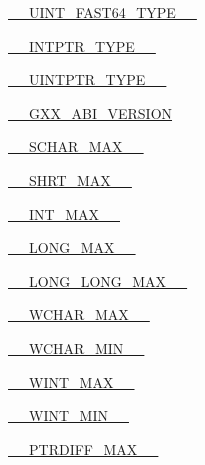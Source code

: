 \begin{DoxyCompactItemize}
\item 
\hyperlink{cmake-build-release_2CMakeCache_8txt_aa588b63d52e2735c82b0262ae2034b2e}{\+\_\+\+\_\+\+U\+I\+N\+T\+\_\+\+F\+A\+S\+T64\+\_\+\+T\+Y\+P\+E\+\_\+\+\_\+}
\item 
\hyperlink{cmake-build-release_2CMakeCache_8txt_ac93efd8e9d485881d53ab451f844c8ec}{\+\_\+\+\_\+\+I\+N\+T\+P\+T\+R\+\_\+\+T\+Y\+P\+E\+\_\+\+\_\+}
\item 
\hyperlink{cmake-build-release_2CMakeCache_8txt_a835a336a71d176cb81526e3e2acf8343}{\+\_\+\+\_\+\+U\+I\+N\+T\+P\+T\+R\+\_\+\+T\+Y\+P\+E\+\_\+\+\_\+}
\item 
\hyperlink{cmake-build-release_2CMakeCache_8txt_af2a3b27e09cc851abc4ef3e7daea66c2}{\+\_\+\+\_\+\+G\+X\+X\+\_\+\+A\+B\+I\+\_\+\+V\+E\+R\+S\+I\+ON}
\item 
\hyperlink{cmake-build-release_2CMakeCache_8txt_ad1e3a625f5463100aab8db5fedf63d52}{\+\_\+\+\_\+\+S\+C\+H\+A\+R\+\_\+\+M\+A\+X\+\_\+\+\_\+}
\item 
\hyperlink{cmake-build-release_2CMakeCache_8txt_aaa2dae7d1963575bc4e3e95e3fee9ed4}{\+\_\+\+\_\+\+S\+H\+R\+T\+\_\+\+M\+A\+X\+\_\+\+\_\+}
\item 
\hyperlink{cmake-build-release_2CMakeCache_8txt_a9fce70495bb7d54b8b4adc9f7f63ea8e}{\+\_\+\+\_\+\+I\+N\+T\+\_\+\+M\+A\+X\+\_\+\+\_\+}
\item 
\hyperlink{cmake-build-release_2CMakeCache_8txt_a9efbe01f7e7b66cbdac106fb51e2f65f}{\+\_\+\+\_\+\+L\+O\+N\+G\+\_\+\+M\+A\+X\+\_\+\+\_\+}
\item 
\hyperlink{cmake-build-release_2CMakeCache_8txt_ade7a297151900f13d47b71e6a9dda0a1}{\+\_\+\+\_\+\+L\+O\+N\+G\+\_\+\+L\+O\+N\+G\+\_\+\+M\+A\+X\+\_\+\+\_\+}
\item 
\hyperlink{cmake-build-release_2CMakeCache_8txt_ab06c84ef26aaf126084f60730505b6b4}{\+\_\+\+\_\+\+W\+C\+H\+A\+R\+\_\+\+M\+A\+X\+\_\+\+\_\+}
\item 
\hyperlink{cmake-build-release_2CMakeCache_8txt_ab2394184364567c4286a32eec574295e}{\+\_\+\+\_\+\+W\+C\+H\+A\+R\+\_\+\+M\+I\+N\+\_\+\+\_\+}
\item 
\hyperlink{cmake-build-release_2CMakeCache_8txt_ade9fb9056c1b3e7f9417478f12ac5452}{\+\_\+\+\_\+\+W\+I\+N\+T\+\_\+\+M\+A\+X\+\_\+\+\_\+}
\item 
\hyperlink{cmake-build-release_2CMakeCache_8txt_a0101eb15159977cbfe763d0d71a7023f}{\+\_\+\+\_\+\+W\+I\+N\+T\+\_\+\+M\+I\+N\+\_\+\+\_\+}
\item 
\hyperlink{cmake-build-release_2CMakeCache_8txt_a047880d1824d5ce75ac17952c273fcc5}{\+\_\+\+\_\+\+P\+T\+R\+D\+I\+F\+F\+\_\+\+M\+A\+X\+\_\+\+\_\+}

\end{DoxyCompactItemize}
